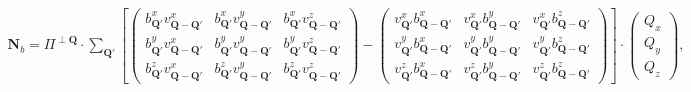 \documentclass[a4paper,11pt]{article}
\begin{document}
\begin{eqnarray}
\mathbf{N}_b  = \Pi^{\perp\mathbf{Q}}\cdot\sum_{\mathbf{Q}'}
\left[
\left(\begin{array}{ccc}
b_{\mathbf{Q}'}^xv_{\mathbf{Q}-\mathbf{Q}'}^x & b_{\mathbf{Q}'}^xv_{\mathbf{Q}-\mathbf{Q}'}^y & b_{\mathbf{Q}'}^xv_{\mathbf{Q}-\mathbf{Q}'}^z \\
b_{\mathbf{Q}'}^yv_{\mathbf{Q}-\mathbf{Q}'}^x & b_{\mathbf{Q}'}^yv_{\mathbf{Q}-\mathbf{Q}'}^y & b_{\mathbf{Q}'}^yv_{\mathbf{Q}-\mathbf{Q}'}^z \\
b_{\mathbf{Q}'}^zv_{\mathbf{Q}-\mathbf{Q}'}^x & b_{\mathbf{Q}'}^zv_{\mathbf{Q}-\mathbf{Q}'}^y & b_{\mathbf{Q}'}^zv_{\mathbf{Q}-\mathbf{Q}'}^z
\end{array} \right)
-
\left(\begin{array}{ccc}
v_{\mathbf{Q}'}^xb_{\mathbf{Q}-\mathbf{Q}'}^x & v_{\mathbf{Q}'}^xb_{\mathbf{Q}-\mathbf{Q}'}^y & v_{\mathbf{Q}'}^xb_{\mathbf{Q}-\mathbf{Q}'}^z \\
v_{\mathbf{Q}'}^yb_{\mathbf{Q}-\mathbf{Q}'}^x & v_{\mathbf{Q}'}^yb_{\mathbf{Q}-\mathbf{Q}'}^y & v_{\mathbf{Q}'}^yb_{\mathbf{Q}-\mathbf{Q}'}^z \\
v_{\mathbf{Q}'}^zb_{\mathbf{Q}-\mathbf{Q}'}^x & v_{\mathbf{Q}'}^zb_{\mathbf{Q}-\mathbf{Q}'}^y & v_{\mathbf{Q}'}^zb_{\mathbf{Q}-\mathbf{Q}'}^z
\end{array} \right)
\right]
\cdot
\left(\begin{array}{c}
Q_x \\
Q_y \\
Q_z
\end{array} \right),
\end{eqnarray}
\end{document}
